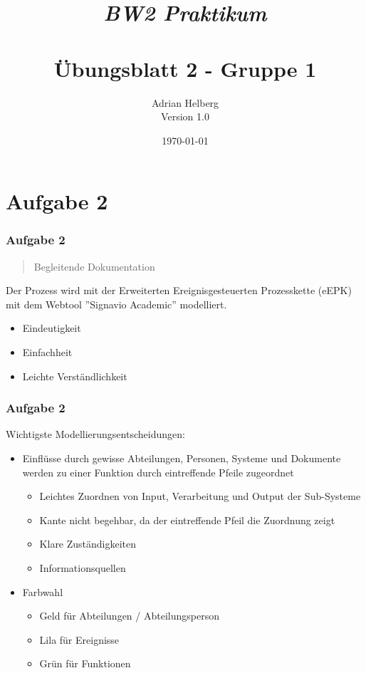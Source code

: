 \documentclass{beamer}
\title{
	\textit{BW2 Praktikum} \\
	\textbf{\\ \"Ubungsblatt 2 - Gruppe 1}
}
\author{Adrian Helberg \\ Version 1.0}
\date{\today}
\begin{document}

\maketitle

\section{Aufgabe 2}
\begin{frame}
\frametitle{Aufgabe 2}

\begin{quote}
Begleitende Dokumentation
\end{quote}

Der Prozess wird mit der Erweiterten Ereignisgesteuerten Prozesskette (eEPK)  mit dem Webtool ''Signavio Academic'' modelliert.
\begin{itemize}
\item Eindeutigkeit
\item Einfachheit 
\item Leichte Verständlichkeit
\end{itemize}

\end{frame}

\begin{frame}
\frametitle{Aufgabe 2}

Wichtigste Modellierungsentscheidungen:
\begin{itemize}
\item Einfl\"usse durch gewisse Abteilungen, Personen, Systeme und Dokumente werden zu einer Funktion durch eintreffende Pfeile zugeordnet
	\begin{itemize}
	\item Leichtes Zuordnen von Input, Verarbeitung und Output der Sub-Systeme
	\item Kante nicht begehbar, da der eintreffende Pfeil die Zuordnung zeigt
	\item Klare Zust\"andigkeiten
	\item Informationsquellen
	\end{itemize}
\item Farbwahl
	\begin{itemize}
	\item Geld f\"ur Abteilungen / Abteilungsperson
	\item Lila f\"ur Ereignisse
	\item Gr\"un f\"ur Funktionen
	\end{itemize}
\end{itemize}


\end{frame}
\end{document}
